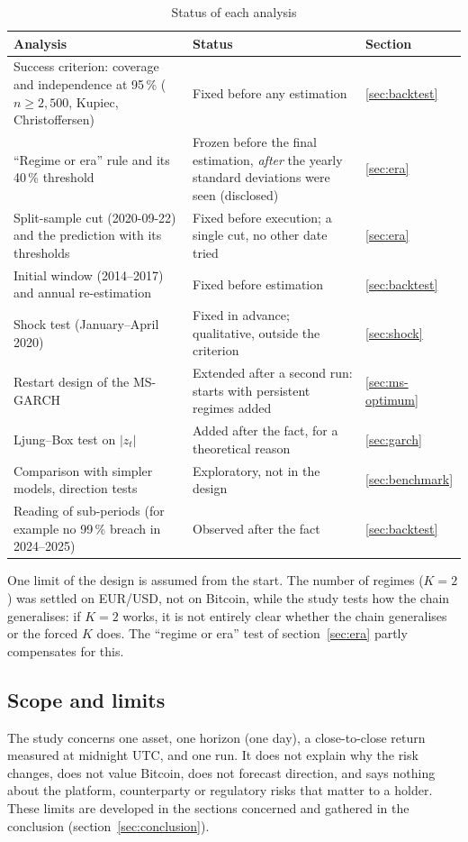 \documentclass[12pt,a4paper]{article}
\begin{document}
\begin{table}[H]
	\centering
	\small
	\caption{Status of each analysis}
	\label{tab:status}
	\begin{tabular}{p{5.4cm}p{6.4cm}l}
		\toprule
		Analysis & Status & Section \\
		\midrule
		Success criterion: coverage and independence at 95\,\% ($n\ge2{,}500$, Kupiec, Christoffersen) & Fixed before any estimation & \ref{sec:backtest} \\
		``Regime or era'' rule and its 40\,\% threshold & Frozen before the final estimation, \emph{after} the yearly standard deviations were seen (disclosed) & \ref{sec:era} \\
		Split-sample cut (2020-09-22) and the prediction with its thresholds & Fixed before execution; a single cut, no other date tried & \ref{sec:era} \\
		Initial window (2014--2017) and annual re-estimation & Fixed before estimation & \ref{sec:backtest} \\
		Shock test (January--April 2020) & Fixed in advance; qualitative, outside the criterion & \ref{sec:shock} \\
		Restart design of the MS-GARCH & Extended after a second run: starts with persistent regimes added & \ref{sec:ms-optimum} \\
		Ljung--Box test on $|z_t|$ & Added after the fact, for a theoretical reason & \ref{sec:garch} \\
		Comparison with simpler models, direction tests & Exploratory, not in the design & \ref{sec:benchmark} \\
		Reading of sub-periods (for example no 99\,\% breach in 2024--2025) & Observed after the fact & \ref{sec:backtest} \\
		\bottomrule
	\end{tabular}
\end{table}

One limit of the design is assumed from the start. The number of regimes ($K=2$) was settled on EUR/USD, not on Bitcoin, while the study tests how the chain generalises: if $K=2$ works, it is not entirely clear whether the chain generalises or the forced $K$ does. The ``regime or era'' test of section~\ref{sec:era} partly compensates for this.

\subsection{Scope and limits}

The study concerns one asset, one horizon (one day), a close-to-close return measured at midnight UTC, and one run. It does not explain why the risk changes, does not value Bitcoin, does not forecast direction, and says nothing about the platform, counterparty or regulatory risks that matter to a holder. These limits are developed in the sections concerned and gathered in the conclusion (section~\ref{sec:conclusion}).
\end{document}
